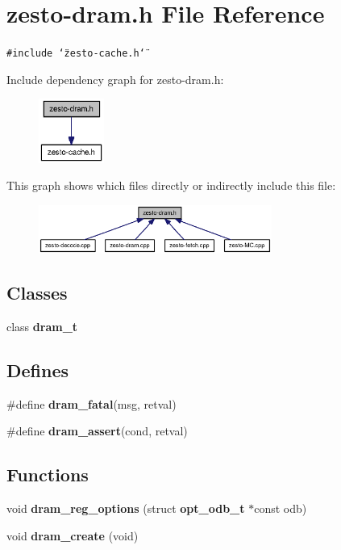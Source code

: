 \section{zesto-dram.h File Reference}
\label{zesto-dram_8h}
{\tt \#include \char`\"{}zesto-cache.h\char`\"{}}\par


Include dependency graph for zesto-dram.h:\nopagebreak
\begin{figure}[H]
\begin{center}
\leavevmode
\includegraphics[width=61pt]{zesto-dram_8h__incl}
\end{center}
\end{figure}


This graph shows which files directly or indirectly include this file:\nopagebreak
\begin{figure}[H]
\begin{center}
\leavevmode
\includegraphics[width=217pt]{zesto-dram_8h__dep__incl}
\end{center}
\end{figure}
\subsection*{Classes}
\begin{CompactItemize}
\item 
class {\bf dram\_\-t}
\end{CompactItemize}
\subsection*{Defines}
\begin{CompactItemize}
\item 
\#define {\bf dram\_\-fatal}(msg, retval)
\item 
\#define {\bf dram\_\-assert}(cond, retval)
\end{CompactItemize}
\subsection*{Functions}
\begin{CompactItemize}
\item 
void {\bf dram\_\-reg\_\-options} (struct {\bf opt\_\-odb\_\-t} $\ast$const odb)
\item 
void {\bf dram\_\-create} (void)
\end{CompactItemize}
